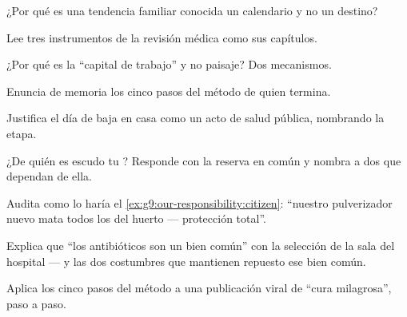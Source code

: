 \begin{exercise}[$\star$]\label{exo:g9:our-responsibility:3}
¿Por qué es una tendencia familiar conocida un calendario y no un
destino?
\end{exercise}

\begin{exercise}[$\star$]\label{exo:g9:our-responsibility:4}
Lee tres instrumentos de la revisión médica como sus capítulos.
\end{exercise}

\begin{exercise}[$\star$]\label{exo:g9:our-responsibility:5}
¿Por qué es la  ``capital de trabajo'' y no paisaje? Dos
mecanismos.
\end{exercise}

\begin{exercise}[$\star$]\label{exo:g9:our-responsibility:6}
Enuncia de memoria los cinco pasos del método de quien termina.
\end{exercise}

\begin{exercise}[$\star\star$]\label{exo:g9:our-responsibility:7}
Justifica el día de baja en casa como un acto de salud pública,
nombrando la etapa.
\end{exercise}

\begin{exercise}[$\star\star$]\label{exo:g9:our-responsibility:8}
¿De quién es escudo tu ? Responde con la reserva en común y
nombra a dos que dependan de ella.
\end{exercise}

\begin{exercise}[$\star\star$]\label{exo:g9:our-responsibility:9}
Audita como lo haría el \cref{ex:g9:our-responsibility:citizen}:
``nuestro pulverizador nuevo mata todos los  del huerto ---
protección total''.
\end{exercise}

\begin{exercise}[$\star\star$]\label{exo:g9:our-responsibility:10}
Explica que ``los antibióticos son un bien común'' con la selección de
la sala del hospital --- y las dos costumbres que mantienen repuesto
ese bien común.
\end{exercise}

\begin{exercise}[$\star\star$]\label{exo:g9:our-responsibility:11}
Aplica los cinco pasos del método a una publicación viral de ``cura
milagrosa'', paso a paso.
\end{exercise}

